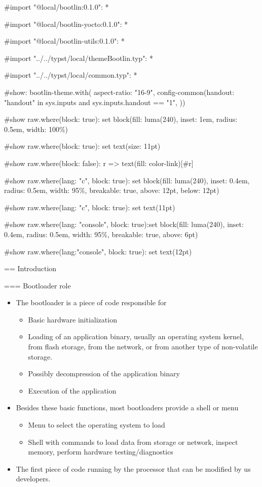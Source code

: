#import "@local/bootlin:0.1.0": *

#import "@local/bootlin-yocto:0.1.0": *

#import "@local/bootlin-utils:0.1.0": *

#import "../../typst/local/themeBootlin.typ": *

#import "../../typst/local/common.typ": *

#show: bootlin-theme.with( aspect-ratio: "16-9", config-common(handout: "handout" in sys.inputs and sys.inputs.handout == "1", ))

#show raw.where(block: true): set block(fill: luma(240), inset: 1em, radius: 0.5em, width: 100\%)

#show raw.where(block: true): set text(size: 11pt)

#show raw.where(block: false): r => text(fill: color-link)[#r]

#show raw.where(lang: "c", block: true): set block(fill: luma(240), inset: 0.4em, radius: 0.5em, width: 95\%, breakable: true, above: 12pt, below: 12pt)

#show raw.where(lang: "c", block: true): set text(11pt)

#show raw.where(lang: "console", block: true):set block(fill: luma(240), inset: 0.4em, radius: 0.5em, width: 95\%, breakable: true, above: 6pt)

#show raw.where(lang:"console", block: true): set text(12pt)

 == Introduction

=== {Bootloader role}
  \begin{itemize}
  \item The bootloader is a piece of code responsible for
    \begin{itemize}
    \item Basic hardware initialization
    \item Loading of an application binary, usually an operating
      system kernel, from flash storage, from the network, or from
      another type of non-volatile storage.
    \item Possibly decompression of the application binary
    \item Execution of the application
    \end{itemize}
  \item Besides these basic functions, most bootloaders provide a
    shell or menu
    \begin{itemize}
    \item Menu to select the operating system to load
    \item Shell with commands to load data from storage or network,
      inspect memory, perform hardware testing/diagnostics
    \end{itemize}
  \item The first piece of code running by the processor that can be
    modified by us developers.
  \end{itemize}


